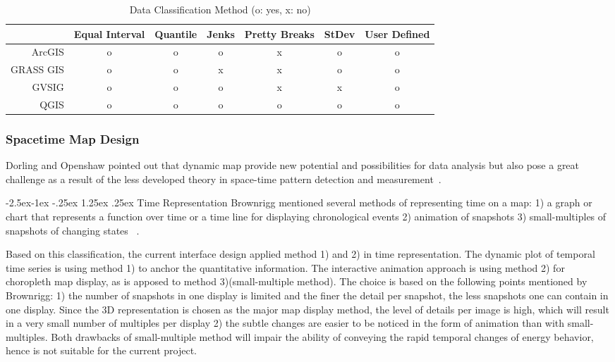 \documentclass[hidelinks,12pt]{article}
\makeatletter
\renewcommand\paragraph{\@startsection{paragraph}{4}{\z@}%
            {-2.5ex\@plus -1ex \@minus -.25ex}%
            {1.25ex \@plus .25ex}%
            {\normalfont\normalsize\bfseries}}
\makeatother
\begin{document}
\begin{table}[h!]
  \centering
  \begin{tabular}{r|c c c c c c}
    \hline
           & Equal Interval & Quantile & Jenks & Pretty Breaks & StDev & User Defined\\
    \hline
    ArcGIS &      o        &    o     &  o    & x &  o  &   o  \\
 GRASS GIS &      o        &    o     &  x    & x &  o  &   o  \\
     GVSIG &      o        &    o     &  o    & x &  x  &   o  \\
      QGIS &      o        &    o     &  o    & o &  o  &   o  \\
    \hline
  \end{tabular}
  \caption{Data Classification Method (o: yes, x: no)}
  \label{tab:classify}
\end{table}

\subsubsection{Spacetime Map Design}
Dorling and Openshaw pointed out that dynamic map provide new
potential and possibilities for data analysis but also pose a great
challenge as a result of the less developed theory in space-time
pattern detection and measurement~\cite{Dorling1992}. 

\paragraph{Time Representation}\label{timeRepresent}
Brownrigg mentioned several methods of representing time on a map: 1)
a graph or chart that represents a function over time or a time line
for displaying chronological events 2) animation of snapshots 3)
small-multiples of snapshots of changing states
~\cite{Brownrigg2005}. 

Based on this classification, the current interface design applied
method 1) and 2) in time representation. The dynamic plot of temporal
time series is using method 1) to anchor the quantitative
information. The interactive animation approach is using method 2) for
choropleth map display, as is apposed to method 3)(small-multiple
method). The choice is based on the following points mentioned by
Brownrigg: 1) the number of snapshots in one display is limited and
the finer the detail per snapshot, the less snapshots one can contain
in one display. Since the 3D representation is chosen as the major map
display method, the level of details per image is high, which will
result in a very small number of multiples per display 2) the subtle
changes are easier to be noticed in the form of animation than with
small-multiples. Both drawbacks of small-multiple method will impair
the ability of conveying the rapid temporal changes of energy
behavior, hence is not suitable for the current project.
\end{document}
